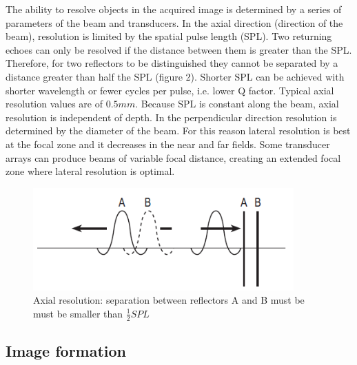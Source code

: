 \documentclass[12pt]{article} %
\begin{document}
	The ability to resolve objects in the acquired image is determined by a series of parameters of the beam and transducers. In the axial direction (direction of the beam), resolution is limited by the spatial pulse length (SPL). Two returning echoes can only be resolved if the distance between them is greater than the SPL. Therefore, for two reflectors to be distinguished they cannot be separated by a distance greater than half the SPL (figure 2). Shorter SPL can be achieved with shorter wavelength or fewer cycles per pulse, i.e. lower Q factor. Typical axial resolution values are of $0.5 mm$. Because SPL is constant along the beam, axial resolution is independent of depth.
In the perpendicular direction resolution is determined by the diameter of the beam. For this reason lateral resolution is best at the focal zone and it decreases in the near and far fields. Some transducer arrays can produce beams of variable focal distance, creating an extended focal zone where lateral resolution is optimal. 

	\begin{figure}
	\centering
	\includegraphics[width=10cm]{figuras/resolution.png}
	\caption{Axial resolution: separation between reflectors A and B must be must 		be smaller than $\frac{1}{2} SPL$ \cite{farr}}
	\end{figure}


\subsection{Image formation}
	
\end{document}
